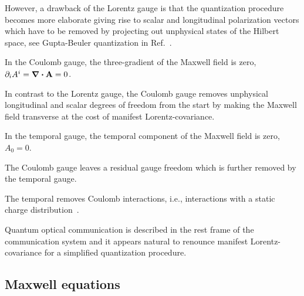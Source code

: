 However, a drawback of the Lorentz gauge is that the quantization procedure becomes more elaborate giving rise to scalar and longitudinal polarization vectors which have to be removed by projecting out unphysical states of the Hilbert space, see Gupta-Beuler quantization in Ref.~\cite[p.~180]{Greiner2013}.
\begin{definition}
	In the Coulomb gauge, the three-gradient of the Maxwell field is zero, $\partial_iA^i=\div\vb{A}=0$.
\end{definition}
In contrast to the Lorentz gauge, the Coulomb gauge removes unphysical longitudinal and scalar degrees of freedom from the start by making the Maxwell field transverse at the cost of manifest Lorentz-covariance.
\begin{definition}
	In the temporal gauge, the temporal component of the Maxwell field is zero, $A_0=0$.
\end{definition}
The Coulomb gauge leaves a residual gauge freedom which is further removed by the temporal gauge.
\begin{remark}
	The temporal removes Coulomb interactions, i.e., interactions with a static charge distribution~\cite[p.~200]{Greiner2013}.
\end{remark}

Quantum optical communication is described in the rest frame of the communication system and it appears natural to renounce manifest Lorentz-covariance for a simplified quantization procedure.

\subsection{Maxwell equations}

